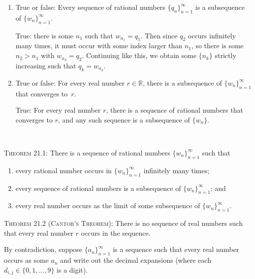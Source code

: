 \documentclass[12pt]{amsart}
\newcommand{\R}{{\mathbb{R}}}
\numberwithin{equation}{section}
\theoremstyle{plain} %
\theoremstyle{definition}
\theoremstyle{remark}
\begin{document}
\begin{enumerate}
\item True or false: Every sequence of rational numbers $\{q_n\}_{n=1}^\infty$ is a subsequence of $\{w_n\}_{n=1}^\infty$.

\begin{framed}
True: there is some $n_1$ such that $w_{n_1} = q_1$. Then since $q_2$ occurs infinitely many times, it must occur with some index larger than $n_1$, so there is some $n_2>n_1$ with $w_{n_2} = q_2$. Continuing like this, we obtain some $\{n_k\}$ strictly increasing such that $q_k = w_{n_k}$.
\end{framed}

\item True or false: For every real number $r\in \R$, there is a subsequence of $\{ w_n\}_{n=1}^\infty$ that converges to~$r$.

\begin{framed}
True: For every real number $r$, there is a sequence of rational numbers that converges to $r$, and any such sequence is a subsequence of $\{w_n\}$.
\end{framed}
\end{enumerate}

\

\begin{framed}
\textsc{Theorem 21.1:} There is a sequence of rational numbers $\{w_n\}_{n=1}^\infty$ such that 
\begin{enumerate}
\item every rational number occurs in $\{w_n\}_{n=1}^\infty$ infinitely many times;
\item every sequence of rational numbers is a subsequence of $\{w_n\}_{n=1}^\infty$; and
\item every real number occurs as the limit of some subsequence of $\{w_n\}_{n=1}^\infty$.
\end{enumerate}\end{framed}


\newpage



\begin{framed}

\noindent \textsc{Theorem 21.2 (Cantor's Theorem):} There is no sequence of real numbers such that every real number $r$ occurs in the sequence.
\end{framed}

\noindent By contradiction, suppose $\{a_n\}_{n=1}^\infty$ is a sequence such that every real number occurs as some $a_n$ and write out the decimal expansions (where each $d_{i,j}\in \{0,1,\dots,9\}$ is a digit).
\end{document}
